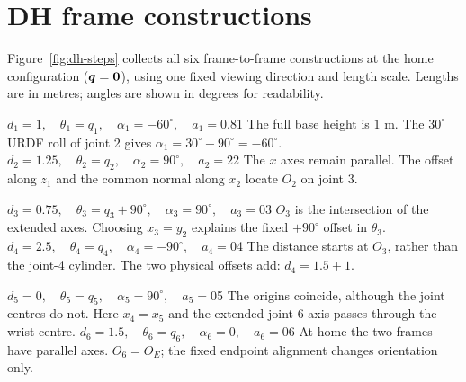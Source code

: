 \section{DH frame constructions}
\label{app:dh-constructions}

Figure~\ref{fig:dh-steps} collects all six frame-to-frame constructions at the
home configuration ($\boldsymbol{q}=\boldsymbol{0}$), using one fixed viewing direction and length scale.
Lengths are in metres; angles are shown in degrees for readability.

\begingroup
\captionsetup{hypcap=false}
\centering
{}
 {$d_1=1,\quad\theta_1=q_1,\quad\alpha_1=-60^\circ,\quad a_1=0.8$}{1}
 {The full base height is $1$ m. The $30^\circ$ URDF roll of joint 2 gives
 $\alpha_1=30^\circ-90^\circ=-60^\circ$.}
\hfill
{}
 {$d_2=1.25,\quad\theta_2=q_2,\quad\alpha_2=90^\circ,\quad a_2=2$}{2}
 {The $x$ axes remain parallel. The offset along $z_1$ and the common normal
 along $x_2$ locate $O_2$ on joint 3.}

\vspace{10pt}
 {$d_3=0.75,\quad\theta_3=q_3+90^\circ,\quad\alpha_3=90^\circ,\quad a_3=0$}{3}
 {$O_3$ is the intersection of the extended axes. Choosing $x_3=y_2$
 explains the fixed $+90^\circ$ offset in $\theta_3$.}
\hfill
{}
 {$d_4=2.5,\quad\theta_4=q_4,\quad\alpha_4=-90^\circ,\quad a_4=0$}{4}
 {The distance starts at $O_3$, rather than the joint-4 cylinder.
 The two physical offsets add: $d_4=1.5+1$.}

\vspace{10pt}
\begin{minipage}{\linewidth}
 {$d_5=0,\quad\theta_5=q_5,\quad\alpha_5=90^\circ,\quad a_5=0$}{5}
 {The origins coincide, although the joint centres do not.
 Here $x_4=x_5$ and the extended joint-6 axis passes through the wrist centre.}
\hfill
{}
 {$d_6=1.5,\quad\theta_6=q_6,\quad\alpha_6=0,\quad a_6=0$}{6}
 {At home the two frames have parallel axes. $O_6=O_E$;
 the fixed endpoint alignment changes orientation only.}

\vspace{9pt}
\label{fig:dh-steps}
\end{minipage}
\par\endgroup
